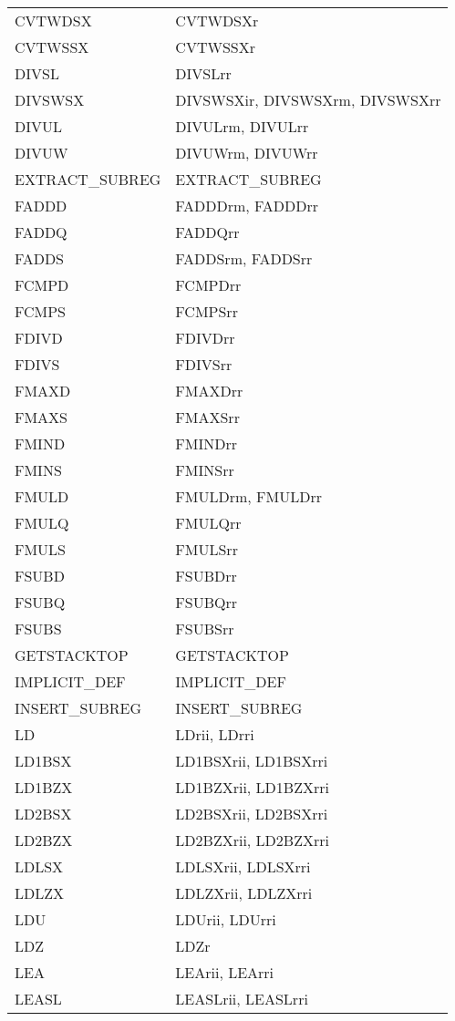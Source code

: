 \begin{xltabular}{\textwidth}{lX}
    CVTWDSX & CVTWDSXr \\
    CVTWSSX & CVTWSSXr \\
    DIVSL & DIVSLrr \\
    DIVSWSX & DIVSWSXir, DIVSWSXrm, DIVSWSXrr \\
    DIVUL & DIVULrm, DIVULrr \\
    DIVUW & DIVUWrm, DIVUWrr \\
    EXTRACT\_SUBREG & EXTRACT\_SUBREG \\
    FADDD & FADDDrm, FADDDrr \\
    FADDQ & FADDQrr \\
    FADDS & FADDSrm, FADDSrr \\
    FCMPD & FCMPDrr \\
    FCMPS & FCMPSrr \\
    FDIVD & FDIVDrr \\
    FDIVS & FDIVSrr \\
    FMAXD & FMAXDrr \\
    FMAXS & FMAXSrr \\
    FMIND & FMINDrr \\
    FMINS & FMINSrr \\
    FMULD & FMULDrm, FMULDrr \\
    FMULQ & FMULQrr \\
    FMULS & FMULSrr \\
    FSUBD & FSUBDrr \\
    FSUBQ & FSUBQrr \\
    FSUBS & FSUBSrr \\
    GETSTACKTOP & GETSTACKTOP \\
    IMPLICIT\_DEF & IMPLICIT\_DEF \\
    INSERT\_SUBREG & INSERT\_SUBREG \\
    LD & LDrii, LDrri \\
    LD1BSX & LD1BSXrii, LD1BSXrri \\
    LD1BZX & LD1BZXrii, LD1BZXrri \\
    LD2BSX & LD2BSXrii, LD2BSXrri \\
    LD2BZX & LD2BZXrii, LD2BZXrri \\
    LDLSX & LDLSXrii, LDLSXrri \\
    LDLZX & LDLZXrii, LDLZXrri \\
    LDU & LDUrii, LDUrri \\
    LDZ & LDZr \\
    LEA & LEArii, LEArri \\
    LEASL & LEASLrii, LEASLrri \\

\end{xltabular}
